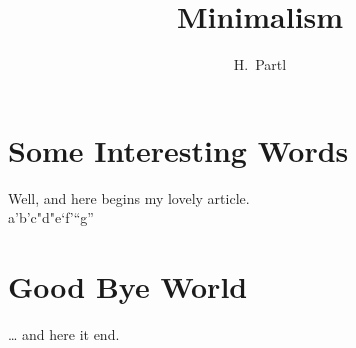 \documentclass[a4paper,11pt]{article}
\title{Minimalism}
\author{H.~Partl}
\begin{document}
        \maketitle
        \tableofcontents

        \section{Some Interesting Words}
        Well, and here begins my lovely article.\\
        a'b'c"d"e`f'``g''
        \section{Good Bye World}
        \ldots{} and here it end.
    
\end{document}
